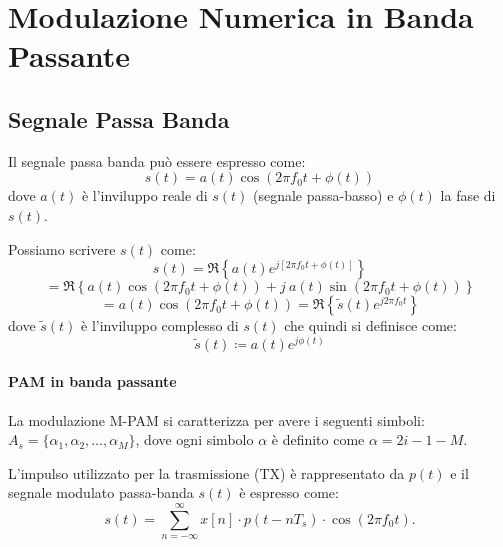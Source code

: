 \section*{Modulazione Numerica in Banda Passante}

\subsection*{Segnale Passa Banda}

Il segnale passa banda può essere espresso come:
\[
    s(t) = a(t) \cos(2\pi f_0 t + \phi(t))
\]
dove \( a(t) \) è l'inviluppo reale di \( s(t) \) (segnale passa-basso) e \( \phi(t) \) la fase di \( s(t) \).



Possiamo scrivere \( s(t) \) come:
\[
    s(t) = \Re\left\{ a(t) e^{j[2\pi f_0 t + \phi(t)]} \right\}
\]
\[
    = \Re\left\{ a(t) \cos(2\pi f_0 t + \phi(t)) + j \ a(t) \sin(2\pi f_0 t + \phi(t)) \right\}
\]
\[
    = a(t) \cos(2\pi f_0 t + \phi(t)) = \Re\left\{ \tilde{s}(t) e^{j2\pi f_0 t} \right\}
\]
dove \( \tilde{s}(t) \) è l'inviluppo complesso di \( s(t) \) che quindi si definisce come:
\[
    \tilde{s}(t) \coloneqq a(t) e^{j\phi(t)}
\]

\paragraph*{PAM in banda passante}



La modulazione M-PAM si caratterizza per avere i seguenti simboli: \( A_s = \{\alpha_1, \alpha_2, \ldots, \alpha_M\} \),
dove ogni simbolo \( \alpha \) è definito come \( \alpha = 2i - 1 - M \).

L'impulso utilizzato per la trasmissione (TX) è rappresentato da \( p(t) \) e
il segnale modulato passa-banda \( s(t) \) è espresso come:
\[
    s(t) = \sum_{n=-\infty}^{\infty} x[n]\cdot p(t - nT_s)\cdot \cos(2\pi f_0 t).
\]

\begin{center}
\end{center}


